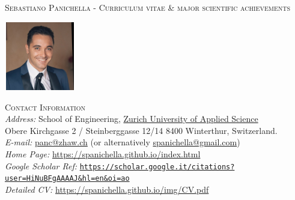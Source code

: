 \documentclass[11pt]{article}
\providecommand*\url[1]{\href{#1}{#1}}
\renewcommand*\url[1]{\href{#1}{\texttt{#1}}}
\providecommand*\email[1]{\href{mailto:#1}{#1}}
\begin{document}
\vspace{-2mm}
\textsc{\fontsize{13}{12}\selectfont Sebastiano Panichella - Curriculum vitae \& major scientific achievements}\\
\vspace{-2mm}


\noindent\begin{minipage}{0.2\textwidth}%
\includegraphics[width=3.11cm, height=3cm]{images/spanichella-hq.jpeg}
\end{minipage}%
\hfill%
\begin{minipage}{0.9\textwidth}\raggedright
\textsc{Contact Information}\\
{\small
\textit{Address:} School of Engineering,  \href{https://www.zhaw.ch/en/about-us/person/panc/}{Zurich University of Applied Science}\\
Obere Kirchgasse 2 / Steinberggasse 12/14
8400 Winterthur, Switzerland.\\
\textit{E-mail:} \email{panc@zhaw.ch} (or alternatively \email{spanichella@gmail.com})\\
\textit{Home Page:} \href{https://spanichella.github.io/index.html}{https://spanichella.github.io/index.html}\\
\textit{Google Scholar Ref:}  \url{https://scholar.google.it/citations?user=HiNuBFgAAAAJ\&hl=en\&oi=ao}\\
\textit{Detailed CV:} \href{https://spanichella.github.io/img/CV.pdf}{https://spanichella.github.io/img/CV.pdf}}\\
\end{minipage}
\end{document}
